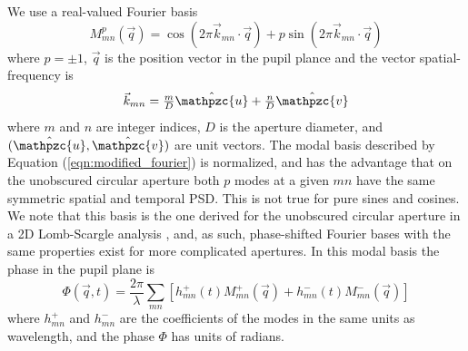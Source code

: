 \documentclass[11pt,preprint]{aastex}
\begin{document}

We use a real-valued Fourier basis
\begin{equation}
M_{mn}^p(\vec{q}) = \cos(2\pi \vec{k}_{mn} \cdot \vec{q}) + p  \sin(2\pi \vec{k}_{mn} \cdot \vec{q})
\label{eqn:modified_fourier}
\end{equation}
where $p=\pm 1$, $\vec{q}$ is the position vector in the pupil plance and the vector spatial-frequency is 
\begin{equation}
\textstyle\vec{k}_{mn} = \textstyle\frac{m}{D} \hat{\mathpzc{u}} + \textstyle\frac{n}{D} \hat{\mathpzc{v}}
\label{eqn:kq_def}
\end{equation}
where $m$ and $n$ are integer indices, $D$ is the aperture diameter, and $(\hat{\mathpzc{u}},\hat{\mathpzc{v}})$ are unit vectors.  The modal basis described by Equation (\ref{eqn:modified_fourier}) is normalized, and has the advantage that on the unobscured circular aperture both $p$ modes at a given $mn$ have the same symmetric spatial and temporal PSD.  This is not true for pure sines and cosines.  We note that this basis is the one derived for the unobscured circular aperture in a 2D Lomb-Scargle analysis \citep{2020arXiv200110200S}, and, as such, phase-shifted Fourier bases with the same properties exist for more complicated apertures.  In this modal basis the phase in the pupil plane is
\begin{equation}
\Phi(\vec{q},t) = \frac{2\pi}{\lambda} \sum\limits_{mn} \left[ h_{mn}^{+}(t) M_{mn}^{+}(\vec{q}) + h_{mn}^{-}(t) M_{mn}^{-}(\vec{q})\right]
\label{eqn:phi_expansion}
\end{equation}
where $h_{mn}^{+}$ and $h_{mn}^{-}$ are the coefficients of the modes in the same units as wavelength, and the phase $\Phi$ has units of radians.
\end{document}
